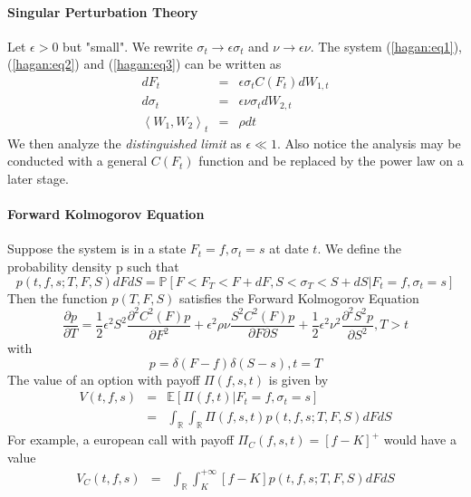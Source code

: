 \documentclass{article}
\begin{document}
\paragraph{Singular Perturbation Theory} Let $\epsilon > 0$ but "small". We rewrite $\sigma_t\rightarrow\epsilon\sigma_t$ and   $\nu\rightarrow\epsilon\nu$. The system (\ref{hagan:eq1}), (\ref{hagan:eq2}) and (\ref{hagan:eq3}) can be written as
%
\begin{eqnarray}
    dF_t      & = & \epsilon\sigma_t C(F_t) dW_{1, t}\label{hagan_t:eq1}\\
    d\sigma_t & = & \epsilon\nu\sigma_t dW_{2, t}\label{hagan_t:eq2}\\
	\left<W_{1}, W_{2}\right>_t & = & \rho dt\label{hagan_t:eq3}
\end{eqnarray}
%
We then analyze the \emph{distinguished limit} as $\epsilon \ll 1$. Also notice the analysis may be conducted with a general $C(F_t)$ function and be replaced by the power law on a later stage.
\paragraph{Forward Kolmogorov Equation} Suppose the system is in a state $F_t = f, \sigma_t=s$  at date $t$. We define the probability density p such that
%
\begin{equation}
p(t, f, s; T, F, S)dFdS = \mathbb P \left[F < F_T<F + dF, S < \sigma_T < S + dS\vert F_t = f, \sigma_t = s \right]
\end{equation}
%
Then the function $p(T, F, S)$ satisfies the Forward Kolmogorov Equation
%
\begin{equation}
\frac{\partial p}{\partial T} =\frac{1}{2}\epsilon^2S^2\frac{\partial^2 C^2(F)p}{\partial F^2} + \epsilon^2\rho\nu\frac{S^2 C^2(F)p}{\partial F\partial S} + \frac{1}{2}\epsilon^2\nu^2\frac{\partial^2 S^2 p}{\partial S^2}, T>t
\end{equation}
%
with 
\begin{equation}
p = \delta(F-f)\delta(S-s), t = T
\end{equation}
%
The value of an option with payoff $\Pi(f, s, t)$ is given by 
%
\begin{eqnarray}
V(t, f, s) & = & \mathbb E \left[\Pi(f, t)\vert F_t = f, \sigma_t = s\right]\\
& = & \int_{\mathbb R}\int_{\mathbb R} \Pi(f, s, t) p(t, f, s; T, F, S)dFdS
\end{eqnarray}
%
For example, a european call with payoff $\Pi_C(f, s, t) = [f-K]^+$ would have a value
%
\begin{eqnarray}
V_C(t, f, s) & = & \int_{\mathbb R}\int_K^{+\infty} [f-K] p(t, f, s; T, F, S)dFdS
\end{eqnarray}
%
\end{document}
